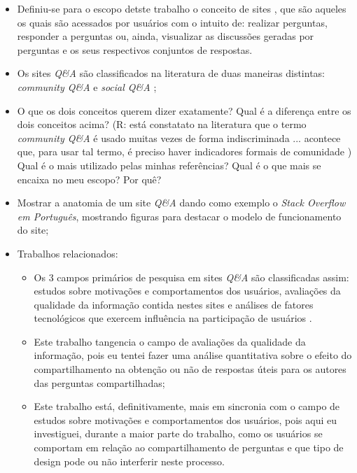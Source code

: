 

\begin{itemize}
  \item Definiu-se para o escopo detste trabalho o conceito de sites \qa, que são aqueles os quais são acessados por usuários com o intuito de: realizar perguntas, responder a perguntas ou, ainda, visualizar as discussões geradas por perguntas e os seus respectivos conjuntos de respostas.
  \item Os sites \textit{Q\&A} são classificados na literatura de duas maneiras distintas: \textit{community Q\&A} e \textit{social Q\&A} \cite{gazan2011social};
  \item O que os dois conceitos querem dizer exatamente? Qual é a diferença entre os dois conceitos acima? (R: está constatato na literatura que o termo \textit{community Q\&A} é usado muitas vezes de forma indiscriminada \cite{rosenbaum2010structuration}... acontece que, para usar tal termo, é preciso haver indicadores formais de comunidade \cite{kling2005understanding}) Qual é o mais utilizado pelas minhas referências? Qual é o que mais se encaixa no meu escopo? Por quê?
  \item Mostrar a anatomia de um site \textit{Q\&A} dando como exemplo o \textit{Stack Overflow em Português}, mostrando figuras para destacar o modelo de funcionamento do site;
  \item Trabalhos relacionados:
    \begin{itemize}
        \item Os 3 campos primários de pesquisa em sites \textit{Q\&A} são classificadas assim: estudos sobre motivações e comportamentos dos usuários, avaliações da qualidade da informação contida nestes sites e análises de fatores tecnológicos que exercem influência na participação de usuários \cite{shah2009research}.
        \item Este trabalho tangencia o campo de avaliações da qualidade da informação, pois eu tentei fazer uma análise quantitativa sobre o efeito do compartilhamento na obtenção ou não de respostas úteis para os autores das perguntas compartilhadas;
        \item Este trabalho está, definitivamente, mais em sincronia com o campo de estudos sobre motivações e comportamentos dos usuários, pois aqui eu investiguei, durante a maior parte do trabalho, como os usuários se comportam em relação ao compartilhamento de perguntas e que tipo de design pode ou não interferir neste processo. 
    \end{itemize}
\end{itemize}
